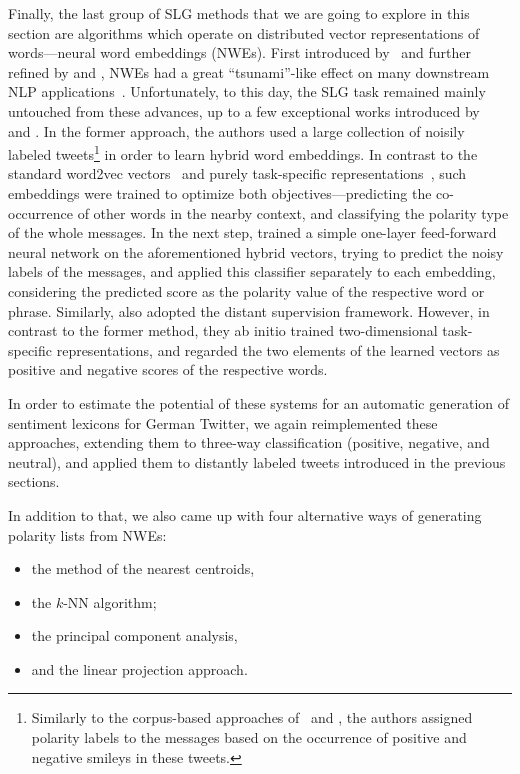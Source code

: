 Finally, the last group of SLG methods that we are going to explore in
this section are algorithms which operate on distributed vector
representations of words---neural word embeddings (NWEs).  First
introduced by~\citet{Bengio:03} and further refined by
\citet{Collobert:11} and \citet{Mikolov:13}, NWEs had a great
``tsunami''-like effect on many downstream NLP
applications~\cite{Manning:15}.  Unfortunately, to this day, the SLG
task remained mainly untouched from these advances, up to a few
exceptional works introduced by~\citet{Tang:14a} and \citet{Vo:16}.
In the former approach, the authors used a large collection of noisily
labeled tweets\footnote{Similarly to the corpus-based approaches
  of~\citet{Kiritchenko:14} and \citet{Severyn:15a}, the authors
  assigned polarity labels to the messages based on the occurrence of
  positive and negative smileys in these tweets.}  in order to learn
hybrid word embeddings.  In contrast to the standard word2vec
vectors~\cite{Mikolov:13} and purely task-specific
representations~\cite{Collobert:11}, such embeddings were trained to
optimize both objectives---predicting the co-occurrence of other words
in the nearby context, and classifying the polarity type of the whole
messages.  In the next step, \citet{Tang:14a} trained a simple
one-layer feed-forward neural network on the aforementioned hybrid
vectors, trying to predict the noisy labels of the messages, and
applied this classifier separately to each embedding, considering the
predicted score as the polarity value of the respective word or
phrase.  Similarly, \citet{Vo:16} also adopted the distant supervision
framework.  However, in contrast to the former method, they ab initio
trained two-dimensional task-specific representations, and regarded
the two elements of the learned vectors as positive and negative
scores of the respective words.

In order to estimate the potential of these systems for an automatic
generation of sentiment lexicons for German Twitter, we again
reimplemented these approaches, extending them to three-way
classification (positive, negative, and neutral), and applied them to
distantly labeled tweets introduced in the previous sections.

In addition to that, we also came up with four alternative ways of
generating polarity lists from NWEs:
\begin{itemize}
\item the method of the nearest centroids,
\item the $k$-NN algorithm;
\item the principal component analysis,
\item and the linear projection approach.
\end{itemize}

